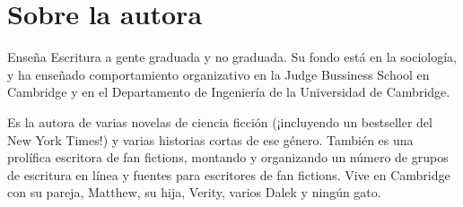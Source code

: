 \chapter*{Sobre la autora}

{Enseña Escritura a gente graduada y no graduada. Su fondo está en la
	sociología, y ha enseñado comportamiento organizativo en la Judge Bussiness
	School en Cambridge y en el Departamento de Ingeniería de la Universidad de
Cambridge.}

{Es la autora de varias novelas de ciencia ficción (¡incluyendo un bestseller
	del New York Times!) y varias historias cortas de ese género. También es una
	prolífica escritora de fan fictions, montando y organizando un número de grupos
	de escritura en línea y fuentes para escritores de fan fictions. Vive en
Cambridge con su pareja, Matthew, su hija, Verity, varios Dalek y ningún gato.}
